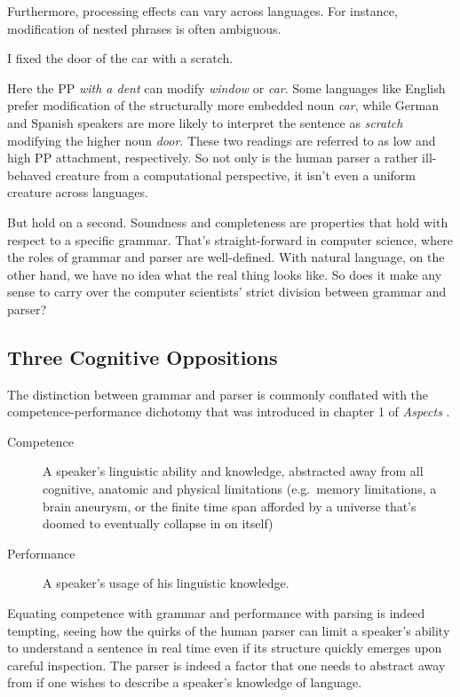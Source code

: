 Furthermore, processing effects can vary across languages.
For instance, modification of nested phrases is often ambiguous.
%
\begin{exe}
    \ex I fixed the door of the car with a scratch.
\end{exe}
%
Here the PP \emph{with a dent} can modify \emph{window} or \emph{car}.
Some languages like English prefer modification of the structurally more embedded noun \emph{car}, while German and Spanish speakers are more likely to interpret the sentence as \emph{scratch} modifying the higher noun \emph{door}.
These two readings are referred to as low and high PP attachment, respectively.
So not only is the human parser a rather ill-behaved creature from a computational perspective, it isn't even a uniform creature across languages.

But hold on a second.
Soundness and completeness are properties that hold with respect to a specific grammar.
That's straight-forward in computer science, where the roles of grammar and parser are well-defined.
With natural language, on the other hand, we have no idea what the real thing looks like.
So does it make any sense to carry over the computer scientists' strict division between grammar and parser?

\subsection{Three Cognitive Oppositions}
\label{sub:BigPicture_Oppositions}
The distinction between grammar and parser is commonly conflated with the competence-performance dichotomy that was introduced in chapter 1 of \emph{Aspects} \citep{Chomsky65}.
%
\begin{description}
    \item[Competence] A speaker's linguistic ability and knowledge, abstracted away from all cognitive, anatomic and physical limitations (e.g.\ memory limitations, a brain aneurysm, or the finite time span afforded by a universe that's doomed to eventually collapse in on itself)
    \item[Performance] A speaker's usage of his linguistic knowledge.
\end{description}
%
Equating competence with grammar and performance with parsing is indeed tempting, seeing how the quirks of the human parser can limit a speaker's ability to understand a sentence in real time even if its structure quickly emerges upon careful inspection.
The parser is indeed a factor that one needs to abstract away from if one wishes to describe a speaker's knowledge of language.

